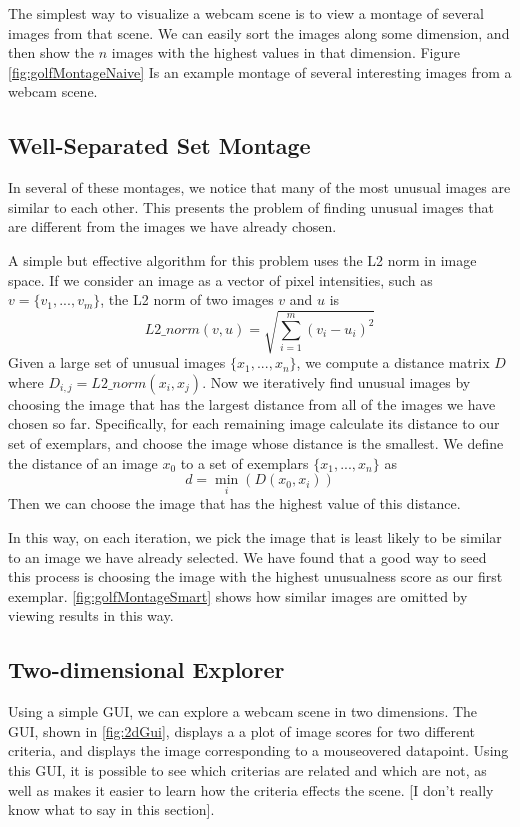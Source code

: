 The simplest way to visualize a webcam scene is to view a montage of several images from that scene.  We can easily sort the images along some dimension, and then show the $n$ images with the highest values in that dimension.  Figure \ref{fig:golfMontageNaive} Is an example montage of several interesting images from a webcam scene.

\subsection{Well-Separated Set Montage}

In several of these montages, we notice that many of the most unusual images are similar to each other.  This presents the problem of finding unusual images that are different from the images we have already chosen.

A simple but effective algorithm for this problem uses the L2 norm in image space.  If we consider an image as a vector of pixel intensities, such as $v = \{v_1, ..., v_m\}$, the L2 norm of two images $v$ and $u$ is $$L2\_norm(v,u) = \sqrt{\sum_{i=1}^m{(v_i-u_i)^2}}$$  Given a large set of unusual images $\{x_1, ..., x_n\}$, we compute a distance matrix $D$ where $D_{i,j} = L2\_norm(x_i, x_j).$  Now we iteratively find unusual images by choosing the image that has the largest distance from all of the images we have chosen so far.  Specifically, for each remaining image calculate its distance to our set of exemplars, and choose the image whose distance is the smallest.  We define the distance of an image $x_0$ to a set of exemplars $\{x_1, ..., x_n\}$ as $$d = \min_i(D(x_0, x_i))$$Then we can choose the image that has the highest value of this distance.

In this way, on each iteration, we pick the image that is least likely to be similar to an image we have already selected.  We have found that a good way to seed this process is choosing the image with the highest unusualness score as our first exemplar.  \ref{fig:golfMontageSmart} shows how similar images are omitted by viewing results in this way.

\subsection{Two-dimensional Explorer}


Using a simple GUI, we can explore a webcam scene in two dimensions.  The GUI, shown in \ref{fig:2dGui}, displays a a plot of image scores for two different criteria, and displays the image corresponding to a mouseovered datapoint.  Using this GUI, it is possible to see which criterias are related and which are not, as well as makes it easier to learn how the criteria effects the scene. [I don't really know what to say in this section].

